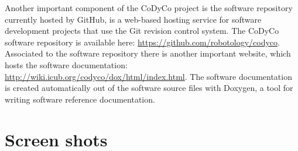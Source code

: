 \documentclass[12pt,a4paper,twoside]{article}
\begin{document}
Another important component of the CoDyCo project is the software repository currently hosted by GitHub, is a web-based hosting service for software development projects that use the Git revision control system. The CoDyCo software repository is available here: \url{https://github.com/robotology/codyco}. Associated to the software repository there is another important website, which hosts the software documentation: \url{http://wiki.icub.org/codyco/dox/html/index.html}. The software documentation is created automatically out of the software source files with Doxygen, a tool for writing software reference documentation.

\section{Screen shots} \label{sec:screen}
\end{document}

